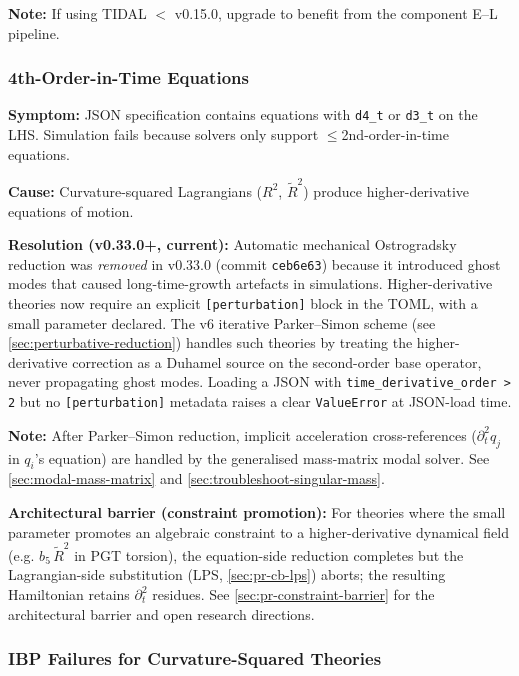 \textbf{Note:} If using TIDAL $<$ v0.15.0, upgrade to benefit from the component E--L pipeline.

\subsubsection{4th-Order-in-Time Equations}
\label{sec:4th-order-eom}

\textbf{Symptom:} JSON specification contains equations with \texttt{d4\_t} or \texttt{d3\_t} on the LHS. Simulation fails because solvers only support $\leq$2nd-order-in-time equations.

\textbf{Cause:} Curvature-squared Lagrangians ($R^2$, $\tilde{R}^2$) produce higher-derivative equations of motion.

\textbf{Resolution (v0.33.0+, current):} Automatic mechanical Ostrogradsky reduction was \emph{removed} in v0.33.0 (commit \texttt{ceb6e63}) because it introduced ghost modes that caused long-time-growth artefacts in simulations.  Higher-derivative theories now require an explicit \texttt{[perturbation]} block in the TOML, with a small parameter declared.  The v6 iterative Parker--Simon scheme (see \cref{sec:perturbative-reduction}) handles such theories by treating the higher-derivative correction as a Duhamel source on the second-order base operator, never propagating ghost modes.  Loading a JSON with \texttt{time\_derivative\_order > 2} but no \texttt{[perturbation]} metadata raises a clear \texttt{ValueError} at JSON-load time.

\textbf{Note:} After Parker--Simon reduction, implicit acceleration cross-references ($\partial_t^2 q_j$ in $q_i$'s equation) are handled by the generalised mass-matrix modal solver. See \cref{sec:modal-mass-matrix} and \cref{sec:troubleshoot-singular-mass}.

\textbf{Architectural barrier (constraint promotion):} For theories where the small parameter promotes an algebraic constraint to a higher-derivative dynamical field (e.g. $b_5\,\tilde{R}^2$ in PGT torsion), the equation-side reduction completes but the Lagrangian-side substitution (LPS, \cref{sec:pr-cb-lps}) aborts; the resulting Hamiltonian retains $\partial_t^2$ residues.  See \cref{sec:pr-constraint-barrier} for the architectural barrier and open research directions.

\subsubsection{IBP Failures for Curvature-Squared Theories}
\label{sec:ibp-curvature-squared}

